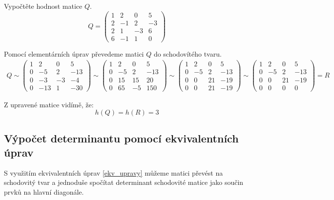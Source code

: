 \begin{example}
    Vypočtěte hodnost matice $Q$.
    \[Q =
    \begin{pmatrix}
        1 & 2 & 0 & 5 \\
        2 & -1 & 2 & -3\\
        2 & 1 & -3 & 6\\
        6 & -1 & 1 & 0
    \end{pmatrix}
    \]

    Pomocí elementárních úprav převedeme matici $Q$ do schodovítého tvaru.
    \begin{align*}
        Q \sim
        \begin{pmatrix}
            1 & 2 & 0 & 5 \\
            0 & -5 & 2 & -13\\
            0 & -3 & -3 & -4\\
            0 & -13 & 1 & -30
        \end{pmatrix} \sim
        \begin{pmatrix}
            1 & 2 & 0 & 5 \\
            0 & -5 & 2 & -13\\
            0 & 15 & 15 & 20\\
            0 & 65 & -5 & 150
        \end{pmatrix} \sim
        \begin{pmatrix}
            1 & 2 & 0 & 5 \\
            0 & -5 & 2 & -13\\
            0 & 0 & 21 & -19\\
            0 & 0 & 21 & -19
        \end{pmatrix} \sim
        \begin{pmatrix}
            1 & 2 & 0 & 5 \\
            0 & -5 & 2 & -13\\
            0 & 0 & 21 & -19\\
            0 & 0 & 0 & 0
        \end{pmatrix} = R
    \end{align*}

    Z upravené matice vidímě, že:
    $$h(Q) = h(R) = 3$$
\end{example}

\subsection{Výpočet determinantu pomocí ekvivalentních úprav}
S využitím ekvivalentních úprav \ref{ekv_upravy} můžeme matici převést na
schodovitý tvar a jednoduše spočítat determinant schodovité matice jako
součin prvků na hlavní diagonále.

